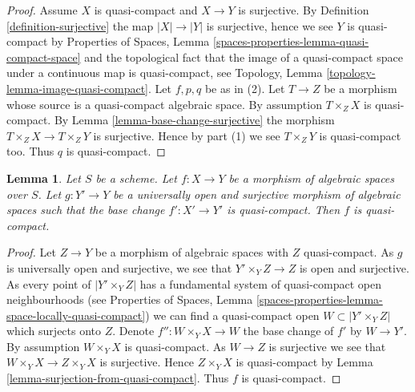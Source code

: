 \documentclass{stacks-project}
\theoremstyle{plain}
\newtheorem{lemma}[subsection]{Lemma}
\theoremstyle{definition}
\theoremstyle{remark}
\numberwithin{equation}{subsection}
\begin{document}
\begin{proof}
Assume $X$ is quasi-compact and $X \to Y$ is surjective. By
Definition \ref{definition-surjective}
the map $|X| \to |Y|$ is surjective, hence we see $Y$ is quasi-compact by
Properties of Spaces, Lemma \ref{spaces-properties-lemma-quasi-compact-space}
and the topological fact that the image of a quasi-compact space under a
continuous map is quasi-compact, see
Topology, Lemma \ref{topology-lemma-image-quasi-compact}.
Let $f, p, q$ be as in (2).
Let $T \to Z$ be a morphism whose source is a quasi-compact algebraic space.
By assumption $T \times_Z X$ is quasi-compact. By
Lemma \ref{lemma-base-change-surjective}
the morphism $T \times_Z X \to T \times_Z Y$ is surjective.
Hence by part (1) we see $T \times_Z Y$ is quasi-compact too.
Thus $q$ is quasi-compact.
\end{proof}

\begin{lemma}
\label{lemma-descent-quasi-compact}
Let $S$ be a scheme.
Let $f : X \to Y$ be a morphism of algebraic spaces over $S$.
Let $g : Y' \to Y$ be a universally open and surjective morphism of
algebraic spaces such that the base change $f' : X' \to Y'$ is quasi-compact.
Then $f$ is quasi-compact.
\end{lemma}

\begin{proof}
Let $Z \to Y$ be a morphism of algebraic spaces with $Z$ quasi-compact.
As $g$ is universally open and surjective, we see that
$Y' \times_Y Z \to Z$ is open and surjective. As every point of
$|Y' \times_Y Z|$ has a fundamental system of quasi-compact open
neighbourhoods (see
Properties of Spaces,
Lemma \ref{spaces-properties-lemma-space-locally-quasi-compact})
we can find a quasi-compact open $W \subset |Y' \times_Y Z|$
which surjects onto $Z$. Denote
$f'' : W \times_Y X \to W$ the base change of $f'$ by $W \to Y'$.
By assumption $W \times_Y X$ is quasi-compact. As $W \to Z$ is surjective
we see that $W \times_Y X \to Z \times_Y X$ is surjective.
Hence $Z \times_Y X$ is quasi-compact by
Lemma \ref{lemma-surjection-from-quasi-compact}.
Thus $f$ is quasi-compact.
\end{proof}
\end{document}
